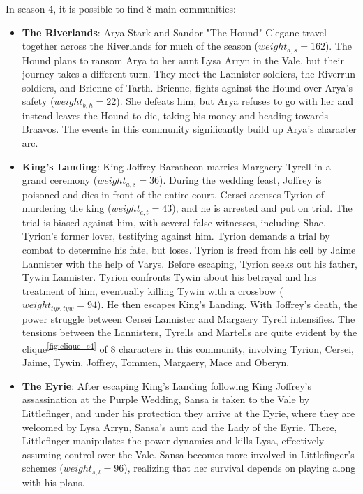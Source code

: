 \documentclass[10pt,twocolumn,letterpaper]{article}
\begin{document}
In season 4, it is possible to find 8 main communities:

\begin{itemize}
    \item \textbf{The Riverlands}: Arya Stark and Sandor "The Hound" Clegane travel together across the Riverlands for much of the season ($weight_{a,s}=162$). The Hound plans to ransom Arya to her aunt Lysa Arryn in the Vale, but their journey takes a different turn. They meet the Lannister soldiers, the Riverrun soldiers, and Brienne of Tarth. Brienne, fights against the Hound over Arya's safety ($weight_{b,h}=22$). She defeats him, but Arya refuses to go with her and instead leaves the Hound to die, taking his money and heading towards Braavos. The events in this community significantly build up Arya's character arc.
    \item \textbf{King's Landing}: King Joffrey Baratheon marries Margaery Tyrell in a grand ceremony ($weight_{a,s}=36$). During the wedding feast, Joffrey is poisoned and dies in front of the entire court. Cersei accuses Tyrion of murdering the king ($weight_{c,t}=43$), and he is arrested and put on trial. The trial is biased against him, with several false witnesses, including Shae, Tyrion's former lover, testifying against him. Tyrion demands a trial by combat to determine his fate, but loses. Tyrion is freed from his cell by Jaime Lannister with the help of Varys. Before escaping, Tyrion seeks out his father, Tywin Lannister. Tyrion confronts Tywin about his betrayal and his treatment of him, eventually killing Tywin with a crossbow ($weight_{tyr,tyw}=94$). He then escapes King's Landing. With Joffrey's death, the power struggle between Cersei Lannister and Margaery Tyrell intensifies. The tensions between the Lannisters, Tyrells and Martells are quite evident by the clique\textsuperscript{\ref{fig:clique_s4}} of 8 characters in this community, involving Tyrion, Cersei, Jaime, Tywin, Joffrey, Tommen, Margaery, Mace and Oberyn.
    \item \textbf{The Eyrie}: After escaping King’s Landing following King Joffrey’s assassination at the Purple Wedding, Sansa is taken to the Vale by Littlefinger, and under his protection they arrive at the Eyrie, where they are welcomed by Lysa Arryn, Sansa’s aunt and the Lady of the Eyrie. There, Littlefinger manipulates the power dynamics and kills Lysa, effectively assuming control over the Vale. Sansa becomes more involved in Littlefinger’s schemes ($weight_{s,l}=96$), realizing that her survival depends on playing along with his plans.

\end{itemize}
\end{document}
